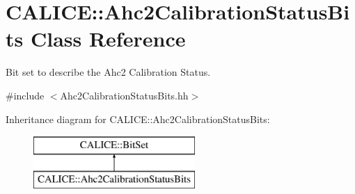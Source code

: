 \section{C\-A\-L\-I\-C\-E\-:\-:Ahc2\-Calibration\-Status\-Bits Class Reference}
\label{classCALICE_1_1Ahc2CalibrationStatusBits}


Bit set to describe the Ahc2 Calibration Status.  




{\ttfamily \#include $<$Ahc2\-Calibration\-Status\-Bits.\-hh$>$}

Inheritance diagram for C\-A\-L\-I\-C\-E\-:\-:Ahc2\-Calibration\-Status\-Bits\-:\begin{figure}[H]
\begin{center}
\leavevmode
\includegraphics[height=2.000000cm]{classCALICE_1_1Ahc2CalibrationStatusBits}
\end{center}
\end{figure}
